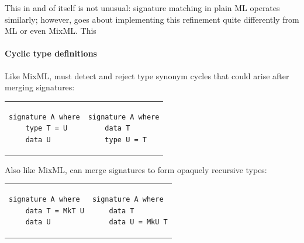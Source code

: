 This in and of itself
is not unusual: signature matching in plain ML operates similarly;
however, \Backpack{} goes about implementing this refinement quite differently
from ML or even MixML\@.  This 


\paragraph{Cyclic type definitions}

Like MixML, \Backpack{} must detect and reject type synonym cycles that
could arise after merging signatures:

\begin{tabular}{p{} p{}}
\begin{verbatim}
signature A where
    type T = U
    data U
\end{verbatim}
&
\begin{verbatim}
signature A where
    data T
    type U = T
\end{verbatim}
\end{tabular}

Also like MixML, \Backpack{} can merge signatures to form opaquely recursive types:

\begin{tabular}{p{} p{}}
\begin{verbatim}
signature A where
    data T = MkT U
    data U
\end{verbatim}
&
\begin{verbatim}
signature A where
    data T
    data U = MkU T
\end{verbatim}
\end{tabular}
